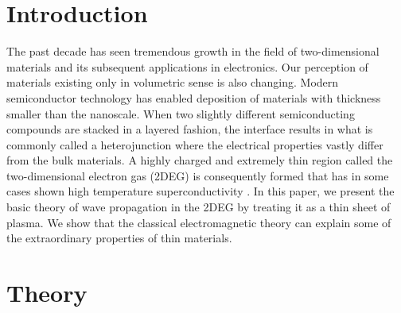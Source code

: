 \documentclass[conference, 10pt]{IEEEtran}
\renewcommand{\^}{\hat}  %
\begin{document}
\section{Introduction}
The past decade has seen tremendous growth in the field of two-dimensional materials and its subsequent applications in electronics. Our perception of materials existing only in volumetric sense is also changing. Modern semiconductor technology has enabled deposition of materials with thickness smaller than the nanoscale. When two slightly different semiconducting compounds are stacked in a layered fashion, the interface results in what is commonly called a heterojunction where the electrical properties vastly differ from the bulk materials. A highly charged and extremely thin region called the two-dimensional electron gas (2DEG) is consequently formed that has in some cases shown high temperature superconductivity \cite{reyren2007superconducting}. In this paper, we present the basic theory of wave propagation in the 2DEG by treating it as a thin sheet of plasma. We show that the classical electromagnetic theory can explain some of the extraordinary properties of thin materials.

\section{Theory}
\end{document}
